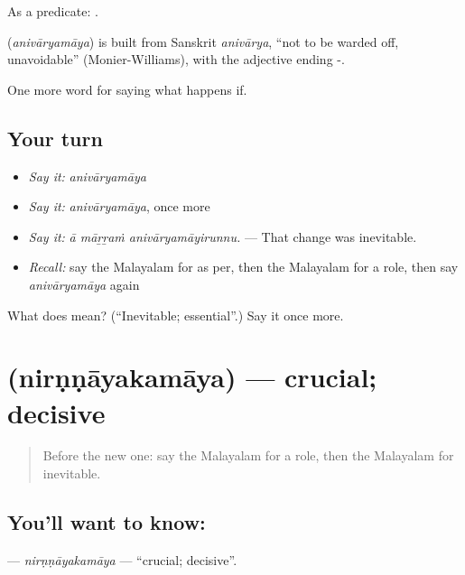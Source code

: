 As a predicate:  .

\begin{cousinweb}
\textbf{} (\emph{anivāryamāya}) is built from Sanskrit \emph{anivārya}, \textquotedblleft{}not to be warded off, unavoidable\textquotedblright{} (Monier-Williams), with the adjective ending -.
\end{cousinweb}

\begin{grammarlens}[title={What you've built}]
One more word for saying what happens if.
\end{grammarlens}

\subsection*{Your turn}
\begin{itemize}
\raggedright
  \item \emph{Say it:} \emph{anivāryamāya}
  \item \emph{Say it:} \emph{anivāryamāya}, once more
  \item \emph{Say it:} \emph{ā māṟṟaṁ anivāryamāyirunnu.} — That change was inevitable.
  \item \emph{Recall:} say the Malayalam for as per, then the Malayalam for a role, then say \emph{anivāryamāya} again
\end{itemize}

\begin{tcolorbox}[breakable,colback=teal!4,colframe=teal!35!black,title={Before you move on}]
What does  mean? (\textquotedblleft{}Inevitable; essential\textquotedblright{}.) Say it once more.
\end{tcolorbox}
\section[\texorpdfstring{\ml{നിർണ്ണായകമായ} (nirṇṇāyakamāya)}{നിർണ്ണായകമായ (nirṇṇāyakamāya)}]{ (nirṇṇāyakamāya) — crucial; decisive}

\label{lesson:ML-C445-nirnnayakamaya}



\begin{quote}
Before the new one: say the Malayalam for a role, then the Malayalam for inevitable.
\end{quote}

\subsection*{You'll want to know: }
\textbf{} — \emph{nirṇṇāyakamāya} — \textquotedblleft{}crucial; decisive\textquotedblright{}.

